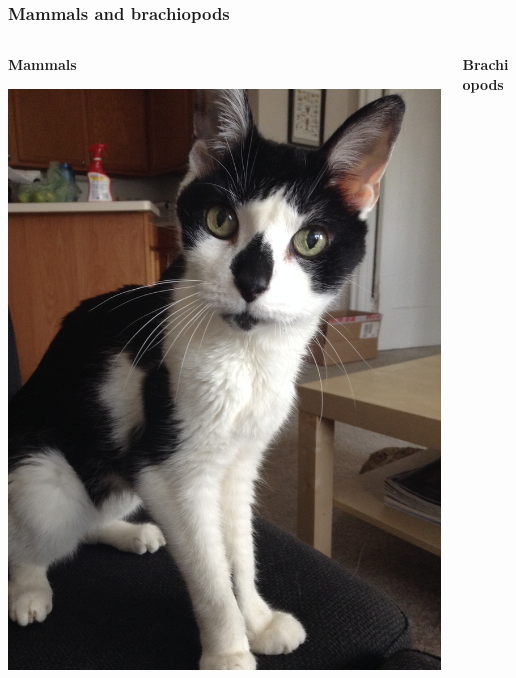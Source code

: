 \documentclass{beamer}
\begin{document}
\begin{frame}
  \frametitle{Mammals and brachiopods}

  \begin{columns}
    \begin{column}{0.5\textwidth}
      \begin{center}
        \textbf{Mammals}

        \vspace{0.5cm}

        \includegraphics[height = 0.6\textheight, keepaspectratio = true]{figure/monty}
      \end{center}
    \end{column}
    \begin{column}{0.5\textwidth}
      \begin{center}
        \textbf{Brachiopods}

        \vspace{0.5cm}


\end{center}
\end{column}
\end{columns}
\end{frame}
\end{document}
